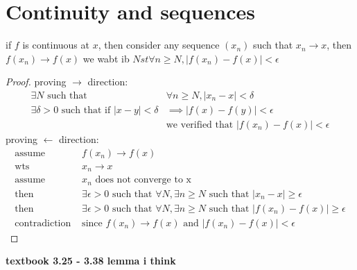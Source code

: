 \documentclass{article}
\begin{document}
\section{Continuity and sequences}
\begin{theorem}
    if $f$ is continuous at $x$, then consider any sequence $(x_n)$ such that $x_n \to x$, then $f(x_n) \to f(x)$ we wabt ib $N st \forall n \geq N, |f(x_n) - f(x)| < \epsilon$
\end{theorem}
\begin{proof}
    proving $\rightarrow$ direction:
    \begin{align*}
        \exists N \text{ such that } &\forall n \geq N, |x_n - x| < \delta  \\ 
        \exists \delta > 0 \text{ such that  if } |x - y| < \delta &\implies |f(x) - f(y)| < \epsilon \\ 
        &\text{we verified that } |f(x_n) - f(x)| < \epsilon
    \end{align*}
    proving $\leftarrow$ direction:
    \begin{align*}
        \text{assume } &f(x_n) \to f(x) \\ 
        \text{wts } &x_n \to x \\ 
        \text{assume } &x_n \text{ does not converge to x} \\ 
        \text{then } &\exists \epsilon > 0 \text{ such that } \forall N, \exists n \geq N \text{ such that } |x_n - x| \geq \epsilon \\ 
        \text{then } &\exists \epsilon > 0 \text{ such that } \forall N, \exists n \geq N \text{ such that } |f(x_n) - f(x)| \geq \epsilon \\ 
        \text{contradiction } &\text{since } f(x_n) \to f(x) \text{ and } |f(x_n) - f(x)| < \epsilon
    \end{align*}
\end{proof}
\textbf{textbook 3.25 - 3.38 lemma i think}
\end{document}
